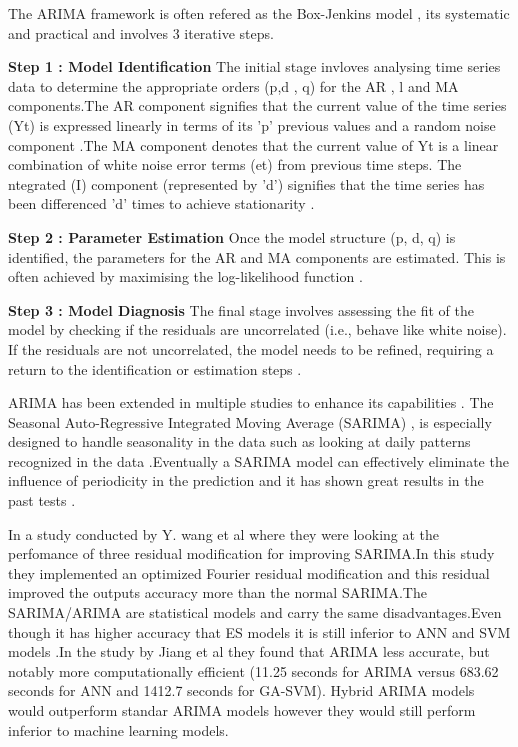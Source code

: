  The  ARIMA framework is often refered as the Box-Jenkins model , its systematic and practical and involves 3 iterative steps.
 
\textbf{Step 1 : Model Identification} The initial stage invloves analysing time series data to determine the appropriate orders (p,d , q) for the AR , l and MA components.The AR component signifies that the current value of the time series (Yt)  is expressed linearly in terms of its 'p' previous values and a random noise component \cite{dai2020short}.The MA component denotes that the current value of Yt is a linear combination of white noise error terms (et) from previous time steps. The ntegrated (I) component (represented by 'd') signifies that the time series has been differenced 'd' times to achieve stationarity \cite{ahmed2020review}.

 \textbf{Step 2 : Parameter Estimation} Once the model structure (p, d, q) is identified, the parameters for the AR and MA components are estimated. This is often achieved by maximising the log-likelihood function \cite{ramos2015performance}.
 
 \textbf{Step 3 : Model Diagnosis} The final stage involves assessing the fit of the model by checking if the residuals are uncorrelated (i.e., behave like white noise). If the residuals are not uncorrelated, the model needs to be refined, requiring a return to the identification or estimation steps \cite{ramos2015performance}.
 
 ARIMA has been extended in multiple studies to enhance its capabilities . The Seasonal Auto-Regressive Integrated Moving Average (SARIMA) , is especially designed to handle seasonality in the data such as looking at daily patterns recognized in the data \cite{abbas2025self}.Eventually a SARIMA model can effectively eliminate the influence of periodicity in the prediction and it has shown great results in the past tests \cite{wang2012application}.
 
 In a study conducted by Y. wang et al  \cite{wang2012application} where they were looking at the perfomance of three residual modification for improving SARIMA.In this study they implemented an optimized Fourier residual modification and this residual improved the outputs accuracy more than the normal SARIMA.The SARIMA/ARIMA are statistical models and carry the same disadvantages.Even though it has higher accuracy that ES models it is still inferior to ANN and SVM models \cite{jiang2016short}.In the study by Jiang et al \cite{jiang2016short} they found that ARIMA less accurate, but notably more computationally efficient (11.25 seconds for ARIMA versus 683.62 seconds for ANN and 1412.7 seconds for GA-SVM). Hybrid ARIMA models would outperform standar ARIMA models however they would still perform inferior to machine learning models.
 
